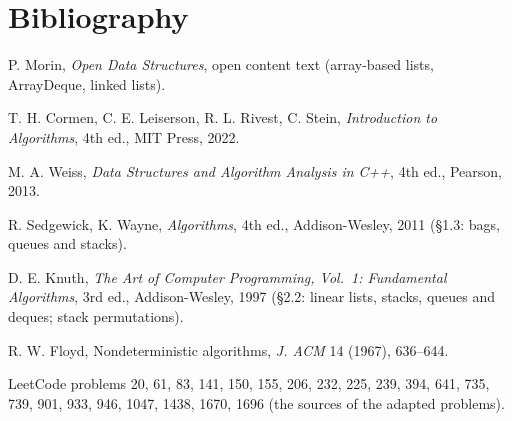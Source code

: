 \chapter*{Bibliography}
\begin{enumerate}[label={[\arabic*]},leftmargin=*]
\item P. Morin, \emph{Open Data Structures}, open content text (array-based lists,
  ArrayDeque, linked lists).
\item T. H. Cormen, C. E. Leiserson, R. L. Rivest, C. Stein, \emph{Introduction to
  Algorithms}, 4th ed., MIT Press, 2022.
\item M. A. Weiss, \emph{Data Structures and Algorithm Analysis in C++}, 4th ed.,
  Pearson, 2013.
\item R. Sedgewick, K. Wayne, \emph{Algorithms}, 4th ed., Addison-Wesley, 2011
  (\S1.3: bags, queues and stacks).
\item D. E. Knuth, \emph{The Art of Computer Programming, Vol.~1: Fundamental
  Algorithms}, 3rd ed., Addison-Wesley, 1997 (\S2.2: linear lists, stacks, queues and
  deques; stack permutations).
\item R. W. Floyd, Nondeterministic algorithms, \emph{J. ACM} 14 (1967), 636--644.
\item LeetCode problems 20, 61, 83, 141, 150, 155, 206, 232, 225, 239, 394, 641, 735,
  739, 901, 933, 946, 1047, 1438, 1670, 1696 (the sources of the adapted problems).
\end{enumerate}
